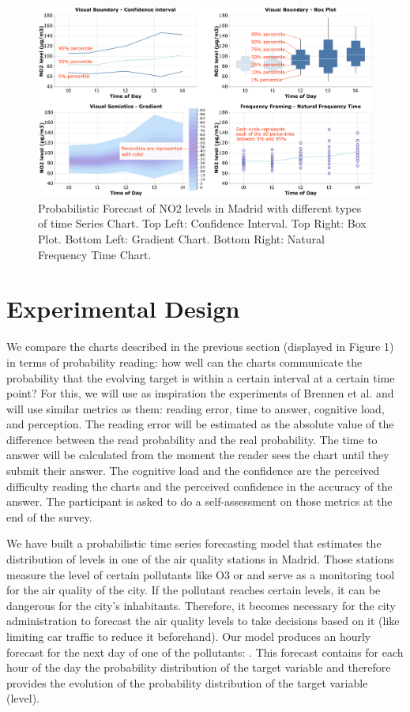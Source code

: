 \documentclass[a4paper,3p,sort&compress]{elsarticle}
\begin{document}
\begin{figure}
  \centering
  \includegraphics[width=.9\textwidth]{charts_vector}
  \caption{\label{figure:charts} Probabilistic Forecast of NO2 levels in Madrid with different types of time Series Chart.
  Top Left: Confidence Interval. Top Right: Box Plot.
  Bottom Left: Gradient Chart. Bottom Right: Natural Frequency Time Chart. }
\end{figure}

\section{Experimental Design}
\label{sec:exp_design}

We compare the charts described in the previous section (displayed in Figure 1)
in terms of probability
reading: how well
can the charts communicate the probability that the evolving target is within a certain interval
at a certain time point?
 For this, we will use as inspiration the experiments of Brennen et al. \cite{brennen_instrument_2018}
and will use similar metrics
as them: reading error, time to answer, cognitive load, and perception. The reading error will be estimated as the
absolute value of the difference between the read probability and the real probability. The time to answer
will be calculated from the moment the reader sees the chart until they submit their answer. The cognitive
load and the confidence are the perceived difficulty reading the charts and the perceived confidence in
the accuracy of
the answer. The participant is asked to do a self-assessment on those metrics at the end of the survey.

We have built a probabilistic time series forecasting model that estimates the distribution of \no
levels in one of the air quality stations in Madrid. Those stations measure the level of certain
pollutants like O3 or \no and serve as a monitoring tool for the air quality of the city. If the pollutant
reaches certain levels, it can be dangerous for the city's inhabitants. Therefore, it becomes necessary
for the city administration to
forecast the air quality levels to take decisions based on it (like limiting car traffic to reduce it beforehand).
Our model produces an hourly forecast for the next day of one of the pollutants: \no. This forecast contains
for each hour of the day the probability distribution of the target variable and therefore provides the evolution
of the probability distribution of the target variable (\no level).
\end{document}
